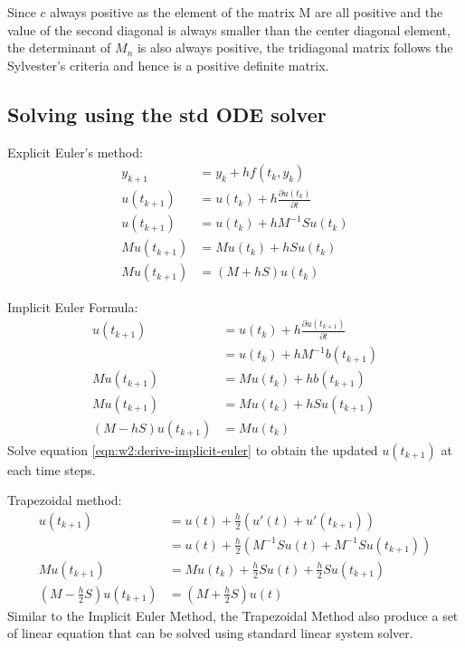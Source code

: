 \documentclass{article}
\begin{document}
Since $c$ always positive as the element of the matrix M are all positive and the value of the second diagonal is always smaller than the center diagonal element, the determinant of $M_n$ is also always positive, the tridiagonal matrix follows the Sylvester's criteria and hence is a positive definite matrix.



\subsection{Solving using the std ODE solver}%
\label{sub:Solving using the std ODE solver}
Explicit Euler's method:
\begin{align}
  y_{k+1} &= y_k + hf(t_k, y_k) \\
  u(t_{k+1}) &= u(t_k) + h \frac{\partial u(t_k)}{\partial t} \\
  u(t_{k+1}) &= u(t_k) + h M^{-1} S u(t_k) \\
  M u(t_{k+1}) &= M u(t_k) + h S u(t_k) \\
  M u(t_{k+1}) &= (M + hS) u(t_k) \label{eqn:w2:derived-explicit-euler}
\end{align}

Implicit Euler Formula:
\begin{align}
  u(t_{k+1}) &= u(t_k) + h \frac{\partial u(t_{k+1})}{\partial t} \\
             &= u(t_k) + h M^{-1} b(t_{k+1}) \\
  M u(t_{k+1}) &= M u(t_k) + hb(t_{k+1}) \\
  M u(t_{k+1}) &= M u(t_k) + h S u(t_{k+1}) \\
  (M - h S) u(t_{k+1}) &= M u(t_k) \label{eqn:w2:derive-implicit-euler}
\end{align}
Solve equation \ref{eqn:w2:derive-implicit-euler} to obtain the updated $u(t_{k+1})$ at each time steps.

Trapezoidal method:
\begin{align}
  u(t_{k+1}) &= u(t) + \frac{h}{2} \left(u'(t) + u'(t_{k+1}) \right) \\
             &= u(t) + \frac{h}{2} \left( M^{-1} S u(t) + M^{-1} S u(t_{k+1}) \right) \\
  M u(t_{k+1}) &= M u(t_k) + \frac{h}{2} S u(t) + \frac{h}{2} S u(t_{k+1}) \\
  \left(M - \frac{h}{2}S \right) u(t_{k+1}) &= \left( M + \frac{h}{2}S \right) u(t) \label{eqn:w2:derived-trapezoidal-method}
\end{align}
Similar to the Implicit Euler Method, the Trapezoidal Method also produce a set of linear equation that can be solved using standard linear system solver.
\end{document}
